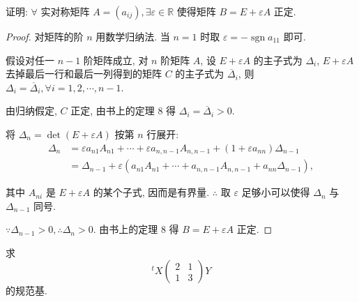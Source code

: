 \documentclass[color=black,device=normal,lang=cn,mode=geye]{elegantnote}
\begin{document}
\begin{exercise}%
    证明: $\forall$ 实对称矩阵 $A=(a_{ij}),\exists\varepsilon\in\mathbb{R}$ 使得矩阵 $B=E+\varepsilon A$ 正定.
\end{exercise}
\begin{proof}
    对矩阵的阶 $n$ 用数学归纳法. 当 $n=1$ 时取 $\varepsilon=-\operatorname{sgn}a_{11}$ 即可.

    假设对任一 $n-1$ 阶矩阵成立, 对 $n$ 阶矩阵 $A$, 设 $E+\varepsilon A$ 的主子式为 $\Delta_i$, $E+\varepsilon A$ 去掉最后一行和最后一列得到的矩阵 $C$ 的主子式为 $\overline{\Delta}_i$, 则 $\Delta_i=\overline{\Delta}_i,\forall i=1,2,\cdots,n-1$.

    由归纳假定, $C$ 正定, 由书上的定理 8 得 $\Delta_i=\overline{\Delta}_i>0$.
    
    将 $\Delta_n=\det(E+\varepsilon A)$ 按第 $n$ 行展开:
    \begin{align*}
        \Delta_n & =\varepsilon a_{n1}A_{n1}+\cdots+\varepsilon a_{n,n-1}A_{n,n-1}+(1+\varepsilon a_{nn})\Delta_{n-1} \\
        & =\Delta_{n-1}+\varepsilon(a_{n1}A_{n1}+\cdots+a_{n,n-1}A_{n,n-1}+a_{nn}\Delta_{n-1}),
    \end{align*}

    其中 $A_{ni}$ 是 $E+\varepsilon A$ 的某个子式, 因而是有界量. $\therefore$ 取 $\varepsilon$ 足够小可以使得 $\Delta_n$ 与 $\Delta_{n-1}$ 同号.
    
    $\because\Delta_{n-1}>0,\therefore\Delta_n>0$. 由书上的定理 8 得 $B=E+\varepsilon A$ 正定.
\end{proof}
\begin{exercisec}[1.7.2]\label{exc1.7.2}
    求
    \[^tX\begin{pmatrix}
        2 & 1 \\
        1 & 3
    \end{pmatrix}Y\]
    的规范基.
\end{exercisec}
\end{document}
